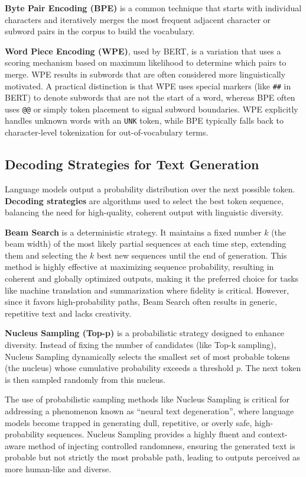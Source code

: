 \documentclass{article}
\begin{document}
\textbf{Byte Pair Encoding (BPE)} is a common technique that starts with individual characters and iteratively merges the most frequent adjacent character or subword pairs in the corpus to build the vocabulary.

\textbf{Word Piece Encoding (WPE)}, used by BERT, is a variation that uses a scoring mechanism based on maximum likelihood to determine which pairs to merge. WPE results in subwords that are often considered more linguistically motivated. A practical distinction is that WPE uses special markers (like \texttt{\#\#} in BERT) to denote subwords that are not the start of a word, whereas BPE often uses \texttt{@@} or simply token placement to signal subword boundaries. WPE explicitly handles unknown words with an \texttt{UNK} token, while BPE typically falls back to character-level tokenization for out-of-vocabulary terms.

\subsection{Decoding Strategies for Text Generation}

Language models output a probability distribution over the next possible token. \textbf{Decoding strategies} are algorithms used to select the best token sequence, balancing the need for high-quality, coherent output with linguistic diversity.

\textbf{Beam Search} is a deterministic strategy. It maintains a fixed number $k$ (the beam width) of the most likely partial sequences at each time step, extending them and selecting the $k$ best new sequences until the end of generation. This method is highly effective at maximizing sequence probability, resulting in coherent and globally optimized outputs, making it the preferred choice for tasks like machine translation and summarization where fidelity is critical. However, since it favors high-probability paths, Beam Search often results in generic, repetitive text and lacks creativity.

\textbf{Nucleus Sampling (Top-p)} is a probabilistic strategy designed to enhance diversity. Instead of fixing the number of candidates (like Top-k sampling), Nucleus Sampling dynamically selects the smallest set of most probable tokens (the nucleus) whose cumulative probability exceeds a threshold $p$. The next token is then sampled randomly from this nucleus.

The use of probabilistic sampling methods like Nucleus Sampling is critical for addressing a phenomenon known as ``neural text degeneration'', where language models become trapped in generating dull, repetitive, or overly safe, high-probability sequences. Nucleus Sampling provides a highly fluent and context-aware method of injecting controlled randomness, ensuring the generated text is probable but not strictly the most probable path, leading to outputs perceived as more human-like and diverse.
\end{document}
